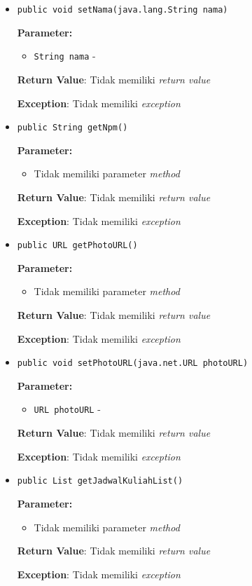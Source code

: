 \documentclass{article}
\begin{document}
\begin{enumerate}
\begin{itemize}
\item \texttt{public void setNama(java.lang.String nama)}

\textbf{Parameter:}
\begin{itemize}
\item \texttt{String nama} - 
\end{itemize}
\textbf{Return Value}: Tidak memiliki \textit{return value}

\textbf{Exception}: Tidak memiliki \textit{exception}

\item \texttt{public String getNpm()}

\textbf{Parameter:}
\begin{itemize}
\item Tidak memiliki parameter \textit{method}
\end{itemize}
\textbf{Return Value}: Tidak memiliki \textit{return value}

\textbf{Exception}: Tidak memiliki \textit{exception}

\item \texttt{public URL getPhotoURL()}

\textbf{Parameter:}
\begin{itemize}
\item Tidak memiliki parameter \textit{method}
\end{itemize}
\textbf{Return Value}: Tidak memiliki \textit{return value}

\textbf{Exception}: Tidak memiliki \textit{exception}

\item \texttt{public void setPhotoURL(java.net.URL photoURL)}

\textbf{Parameter:}
\begin{itemize}
\item \texttt{URL photoURL} - 
\end{itemize}
\textbf{Return Value}: Tidak memiliki \textit{return value}

\textbf{Exception}: Tidak memiliki \textit{exception}

\item \texttt{public List getJadwalKuliahList()}

\textbf{Parameter:}
\begin{itemize}
\item Tidak memiliki parameter \textit{method}
\end{itemize}
\textbf{Return Value}: Tidak memiliki \textit{return value}

\textbf{Exception}: Tidak memiliki \textit{exception}


\end{itemize}
\end{enumerate}
\end{document}
